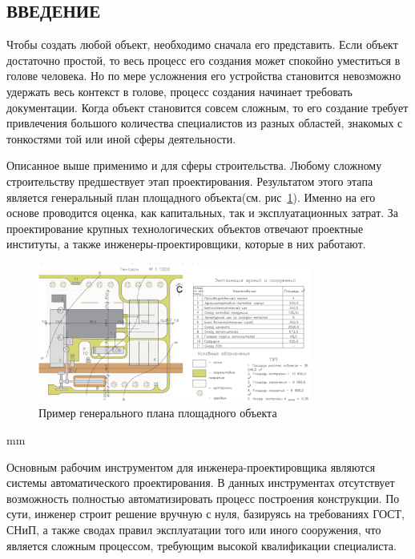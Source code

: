 \begin{center}
	\section*{\large{ВВЕДЕНИЕ}}
\end{center}


Чтобы создать любой объект, необходимо сначала его представить.
Если объект достаточно простой, то весь процесс его создания может спокойно уместиться в голове человека.
Но по мере усложнения его устройства становится невозможно удержать весь контекст в голове,
процесс создания начинает требовать документации.
Когда объект становится совсем сложным, то его создание требует привлечения большого количества специалистов из разных
областей, знакомых с тонкостями той или иной сферы деятельности.

Описанное выше применимо и для сферы строительства.
Любому сложному строительству предшествует этап проектирования.
Результатом этого этапа является генеральный план площадного объекта(см. рис\ \ref{pic:introduction__site-plan}).
Именно на его основе проводится оценка, как капитальных, так и эксплуатационных затрат.
За проектирование крупных технологических объектов отвечают проектные институты,
а также инженеры-проектировщики, которые в них работают.

\begin{figure}[H]
	\vspace*{-0.4 cm}
	\includegraphics[width=0.8\textwidth]{introduction/pictures/site_plan}
	\caption{Пример генерального плана площадного объекта}
	\label{pic:introduction__site-plan}
\end{figure}
 mm

Основным рабочим инструментом для инженера-проектировщика являются системы автоматического проектирования.
В данных инструментах отсутствует возможность полностью автоматизировать процесс построения конструкции.
По сути, инженер строит решение вручную с нуля, базируясь на требованиях ГОСТ, СНиП, а также сводах правил
эксплуатации того или иного сооружения, что является сложным процессом, требующим высокой квалификации специалиста.

